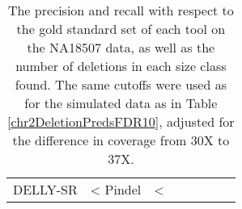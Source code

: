 \begin{table}[t]
\begin{center}
\begin{tabular}{rrr|rrrrr}
  DELLY-SR & <%
  Pindel & <%
   \hline
\end{tabular}
\end{center}
\caption{The precision and recall with respect to the gold standard set of each tool on the NA18507 data, as well as the number of deletions in each size class found. The same cutoffs were used as for the simulated data as in Table \ref{chr2DeletionPredsFDR10}, adjusted for the difference in coverage from 30X to 37X.}
\label{NA18507DeletionPreds}
\end{table}
